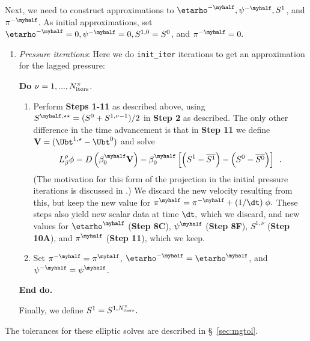 Next, we need to construct approximations to $\etarho^{-\myhalf}, \psi^{-\myhalf}, S^1$,
and $\pi^{-\myhalf}$.  As initial approximations, set 
$\etarho^{-\myhalf}=0, \psi^{-\myhalf}=0, S^{1,0}=S^0$, and $\pi^{-\myhalf}=0.$
\begin{enumerate}
\renewcommand{\theenumi}{{\bf \alph{enumi}}}
\renewcommand{\labelenumii}{\roman{enumii}.}
\addtocounter{enumi}{2}
\item {\it Pressure iterations}: Here we do {\tt init\_iter} iterations to get an
  approximation for the lagged pressure:

  {\bf Do} {$\nu = 1,...,N_{\rm iters}^{\pi}$.}
  \begin{enumerate}
  \item Perform {\bf Steps 1-11} as described above, using 
    $S^{\myhalf,\star\star} = (S^0 + S^{1,\nu-1})/2$ in {\bf Step 2} as described.
    The only other difference in the time advancement is that in {\bf Step 11}
    we define ${\bf V} = (\Ubt^{1,\star} - \Ubt^0)$ and solve
    \begin{equation}  L_\beta^\rho \phi = D \left ( \beta_0^{\myhalf} {\bf V} \right) - \beta_0^{\myhalf} \left[ \left(S^{1}-\overline{S^{1}}\right) - \left(S^{0}-\overline{S^{0}}\right) \right] \enskip . 
    \end{equation}
    (The motivation for this form of the projection in the initial pressure iterations
    is discussed in \cite{almgren:bell:crutchfield}.)
      We discard the new velocity resulting from this, but keep the new  
      value for $\pi^{\myhalf} = \pi^{-\myhalf} + (1 / \dt) \; \phi.$  
      These steps also yield new scalar data at time $\dt,$ which
      we discard, and new values for $\etarho^{\myhalf}$ ({\bf Step 8C}), 
      $\psi^{\myhalf}$ ({\bf Step 8F}), 
      $S^{1,\nu}$ ({\bf Step 10A}), and $\pi^{\myhalf}$ ({\bf Step 11}), which we keep.
    \item Set $\pi^{-\myhalf} = \pi^{\myhalf}$, $\etarho^{-\myhalf} = \etarho^{\myhalf}$,
      and $\psi^{-\myhalf} = \psi^{\myhalf}$. 
    \end{enumerate}
    
    {\bf End do.}
    
    Finally, we define $S^1 = S^{1,N_{\rm iters}^\pi}.$
    
  \end{enumerate}

The tolerances for these elliptic solves are described in \S~\ref{sec:mgtol}.



